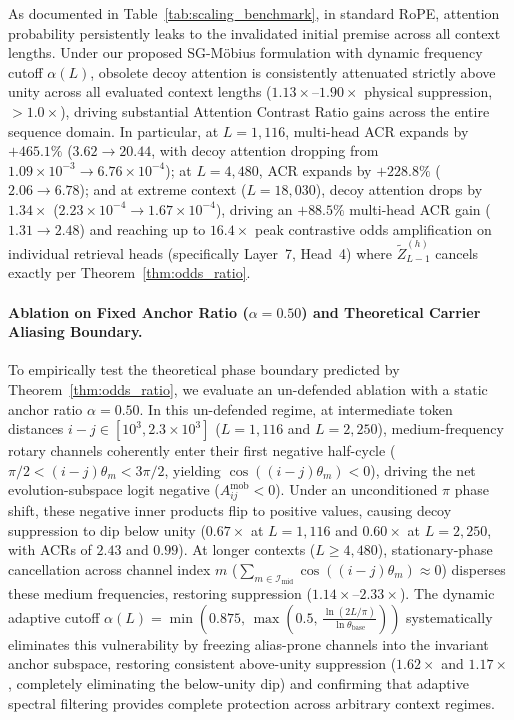 \documentclass[11pt,a4paper]{article}
\theoremstyle{definition}
\begin{document}
As documented in Table~\ref{tab:scaling_benchmark}, in standard RoPE, attention probability persistently leaks to the invalidated initial premise across all context lengths.
Under our proposed SG-M\"obius formulation with dynamic frequency cutoff $\alpha(L)$, obsolete decoy attention is consistently attenuated strictly above unity across all evaluated context lengths ($1.13\times\text{--}1.90\times$ physical suppression, $> 1.0\times$), driving substantial Attention Contrast Ratio gains across the entire sequence domain. In particular, at $L=1,116$, multi-head ACR expands by $+465.1\%$ ($3.62 \to 20.44$, with decoy attention dropping from $1.09 \times 10^{-3} \to 6.76 \times 10^{-4}$); at $L=4,480$, ACR expands by $+228.8\%$ ($2.06 \to 6.78$); and at extreme context ($L=18,030$), decoy attention drops by $1.34\times$ ($2.23\times 10^{-4} \to 1.67\times 10^{-4}$), driving an $+88.5\%$ multi-head ACR gain ($1.31 \to 2.48$) and reaching up to $16.4\times$ peak contrastive odds amplification on individual retrieval heads (specifically Layer~7, Head~4) where $\tilde{Z}_{L-1}^{(h)}$ cancels exactly per Theorem~\ref{thm:odds_ratio}.



\paragraph{Ablation on Fixed Anchor Ratio ($\alpha=0.50$) and Theoretical Carrier Aliasing Boundary.}
To empirically test the theoretical phase boundary predicted by Theorem~\ref{thm:odds_ratio}, we evaluate an un-defended ablation with a static anchor ratio $\alpha=0.50$. In this un-defended regime, at intermediate token distances $i - j \in [10^3, 2.3 \times 10^3]$ ($L=1,116$ and $L=2,250$), medium-frequency rotary channels coherently enter their first negative half-cycle ($\pi/2 < (i-j)\theta_m < 3\pi/2$, yielding $\cos((i-j)\theta_m) < 0$), driving the net evolution-subspace logit negative ($A_{ij}^{\text{mob}} < 0$). Under an unconditioned $\pi$ phase shift, these negative inner products flip to positive values, causing decoy suppression to dip below unity ($0.67\times$ at $L=1,116$ and $0.60\times$ at $L=2,250$, with ACRs of $2.43$ and $0.99$). At longer contexts ($L \ge 4,480$), stationary-phase cancellation across channel index $m$ ($\sum_{m \in \mathcal{I}_{\text{mid}}} \cos((i-j)\theta_m) \approx 0$) disperses these medium frequencies, restoring suppression ($1.14\times\text{--}2.33\times$). The dynamic adaptive cutoff $\alpha(L) = \min\left(0.875, \, \max\left(0.5, \, \frac{\ln(2L/\pi)}{\ln \theta_{\mathrm{base}}}\right)\right)$ systematically eliminates this vulnerability by freezing alias-prone channels into the invariant anchor subspace, restoring consistent above-unity suppression ($1.62\times$ and $1.17\times$, completely eliminating the below-unity dip) and confirming that adaptive spectral filtering provides complete protection across arbitrary context regimes.
\end{document}
